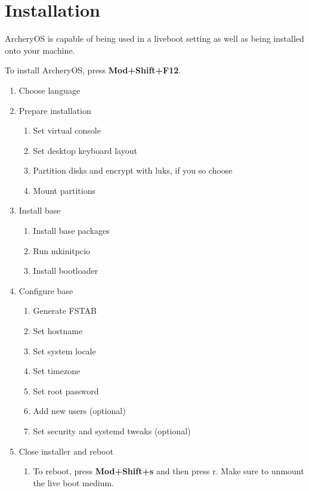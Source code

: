 \documentclass{article}
\begin{document}
\pagebreak
\section{Installation}
ArcheryOS is capable of being used in a liveboot setting as well as being installed onto your machine.\@

\noindent
To install ArcheryOS, press \textbf{Mod+Shift+F12}.


\begin{enumerate}\bfseries
	\item Choose language
	\item Prepare installation
	\begin{enumerate}\bfseries
		\item Set virtual console
		\item Set desktop keyboard layout
		\item Partition disks and encrypt with luks, if you so choose
		\item Mount partitions
	\end{enumerate}
	\item Install base
	\begin{enumerate}\bfseries
		\item Install base packages
		\item Run mkinitpcio
		\item Install bootloader
	\end{enumerate}
	\item Configure base
	\begin{enumerate}\bfseries
		\item Generate FSTAB
		\item Set hostname
		\item Set system locale
		\item Set timezone
		\item Set root password
		\item Add new users (optional)
		\item Set security and systemd tweaks (optional)
	\end{enumerate}
	\item Close installer and reboot
	\begin{enumerate}\bfseries
		\item To reboot, press \textbf{Mod+Shift+s} and then press r. Make sure to unmount the live boot medium.
	\end{enumerate}
\end{enumerate}

\pagebreak
\end{document}
